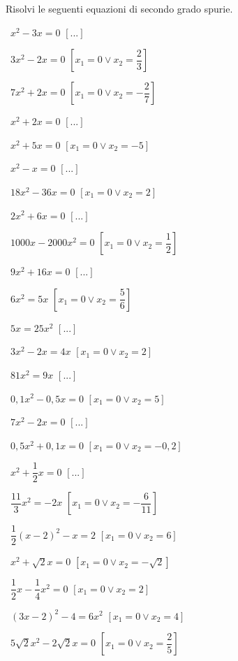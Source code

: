 \begin{esercizio}[\Ast]
\label{ese:3.5}
Risolvi le seguenti equazioni di secondo grado spurie.
\begin{multicols}{2}
 \begin{enumeratea}
 \item~$x^{2} - 3 x = 0$ \hfill$\left[...\right]$
 \item~$3 x^{2} - 2 x = 0$ 
  \hfill$\left[x_{1} = 0 \vee x_{2} = \dfrac{2}{3}\right]$
 \item~$7 x^{2} + 2 x = 0$ 
  \hfill$\left[x_{1} = 0 \vee x_{2} = - \dfrac{2}{7}\right]$
 \item~$x^{2} + 2 x = 0$ \hfill$\left[...\right]$
 \item~$x^{2} + 5 x = 0$ 
  \hfill$\left[x_{1} = 0 \vee x_{2} = - 5\right]$
 \item~$x^{2} - x = 0$ \hfill$\left[...\right]$
 \item~$18 x^{2} - 36 x = 0$ \hfill$\left[x_{1} = 0 \vee x_{2} = 2\right]$
 \item~$2x^{2} + 6x = 0$ \hfill$\left[...\right]$
 \item~$1000 x - 2000 x^{2} = 0$ \hfill$\left[x_{1} = 0 \vee x_{2} = 
\dfrac{1}{2}\right]$
 \item~$9x^{2} + 16x = 0$ \hfill$\left[...\right]$
 \item~$6 x^{2} = 5 x$ \hfill$\left[x_{1} = 0 \vee x_{2} = 
\dfrac{5}{6}\right]$
 \item~$5x = 25x^{2}$ \hfill$\left[...\right]$
 \item~$3 x^{2} - 2 x = 4 x$ \hfill$\left[x_{1} = 0 \vee x_{2} = 2\right]$
 \item~$81x^{2} = 9x$ \hfill$\left[...\right]$
 \item~$0,1 x^{2} - 0,5 x = 0$ \hfill$\left[x_{1} = 0 \vee x_{2} = 5\right]$
 \item~$7x^{2} - 2x = 0$ \hfill$\left[...\right]$
 \item~$0,5 x^{2} + 0,1 x = 0$ \hfill$\left[x_{1} = 0 \vee x_{2} = - 
0,2\right]$
 \item~$x^{2} + \dfrac{1}{2} x = 0$ \hfill$\left[...\right]$
 \item~$\dfrac{11}{3} x^{2} = - 2 x$ 
  \hfill$\left[x_{1} = 0 \vee x_{2} = - \dfrac{6}{11}\right]$
 \item~$\dfrac{1}{2} ( x - 2 )^{2} - x = 2$
  \hfill$\left[x_{1} = 0 \vee x_{2} = 6\right]$
 \item~$x^{2} + \sqrt{2} x = 0$ 
  \hfill$\left[x_{1} = 0 \vee x_{2} = - \sqrt{2}\right]$
 \item~$\dfrac{1}{2} x - \dfrac{1}{4} x^{2} = 0$ 
  \hfill$\left[x_{1} = 0 \vee x_{2} = 2\right]$
 \item~$(3 x - 2)^{2} - 4 = 6 x^{2}$
  \hfill$\left[x_{1} = 0 \vee x_{2} = 4\right]$
 \item~$5 \sqrt{2} x^{2} - 2 \sqrt{2} x = 0$ 
  \hfill$\left[x_{1} = 0 \vee x_{2} = \dfrac{2}{5}\right]$
 \end{enumeratea}
 \end{multicols}
\end{esercizio}


